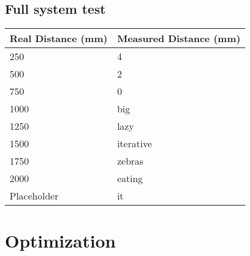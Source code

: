 \subsection{Full system test}
\begin{table}[H]
\centering
    \begin{tabular}{|l|l|}
    \hline
    Real Distance (mm) & Measured Distance (mm) \\ \hline
    250                & 4                      \\ \hline
    500                & 2                      \\ \hline
    750                & 0                      \\ \hline
    1000               & big                    \\ \hline
    1250               & lazy                   \\ \hline
    1500               & iterative              \\ \hline
    1750               & zebras                 \\ \hline
    2000               & eating                 \\ \hline
    Placeholder        & it                     \\ \hline
    \end{tabular}
\end{table}

\section{Optimization}